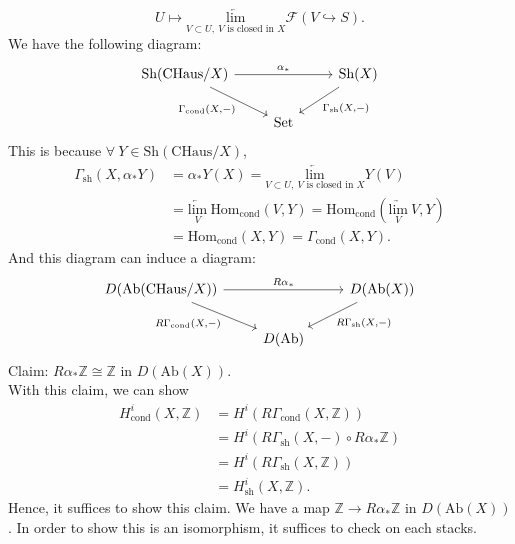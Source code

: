 \documentclass[UTF8,12,a4paper]{ctexart}
\theoremstyle{definition}
\begin{document}
\begin{itemize}
  	$$U\mapsto \underset{V\subset U,\ V \text{ is closed in } X}{\underleftarrow{\text{lim}} }\mathcal{F}(V\hookrightarrow S).$$ 
  	We have the following diagram:
  	\begin{equation*}
  	\begin{tikzcd}
  	\text{Sh}(\text{CHaus}/X) \arrow[rr, "\alpha_*"] \arrow[rd, "{\Gamma_{\text{cond}}(X,-)}"'] &            & \text{Sh}(X) \arrow[ld, "{\Gamma_{\text{sh}}(X,-)}"] \\
  	& \text{Set} &                                                     
  	\end{tikzcd}
  	\end{equation*}
  	This is because $\forall\  Y\in \text{Sh}(\text{CHaus}/X)$,
  	\begin{align*}
  	\Gamma_{\text{sh}}(X,\alpha_* Y)
  	&=\alpha_* Y(X)=\underset{V\subset U,\ V \text{ is closed in } X}{\underleftarrow{\text{lim}} } Y(V)\\
  	&=\underset{V}{\underleftarrow{\text{lim}}}\  \text{Hom}_\text{cond}(V,Y)=\text{Hom}_\text{cond}(\underset{V}{\underrightarrow{\text{lim}}} \ V,Y)\\
  	&=\text{Hom}_\text{cond}(X,Y)=\Gamma_{\text{cond}}(X,Y).
  	\end{align*}
  	And this diagram can induce a diagram:
  	\begin{equation*}
  	\begin{tikzcd}
  	D(\text{Ab}(\text{CHaus}/X)) \arrow[rr, "R\alpha_*"] \arrow[rd, "{R\Gamma_{\text{cond}}(X,-)}"'] &            & D(\text{Ab}(X)) \arrow[ld, "{R\Gamma_{\text{sh}}(X,-)}"] \\
  	& D(\text{Ab}) &                                                     
  	\end{tikzcd}
  	\end{equation*}
  	Claim: $R\alpha_*\mathbb{Z}\cong \mathbb{Z}$ in $D(\text{Ab}(X))$.\\
  	With this claim, we can show 
  	\begin{align*}
  	H^i_{\text{cond}}(X,\mathbb{Z})
  	&=H^i(R\Gamma_{\text{cond}}(X,\mathbb{Z}))\\
  	&=H^i(R\Gamma_{\text{sh}}(X,-)\circ R\alpha_* \mathbb{Z})\\
  	&=H^i(R\Gamma_{\text{sh}}(X,\mathbb{Z}))\\
  	&=H^i_\text{sh}(X,\mathbb{Z}).
  	\end{align*}
  	Hence, it suffices to show this claim. We have a map $\mathbb{Z}\to  R\alpha_*\mathbb{Z}$ in $D(\text{Ab}(X))$. In order to show this is an isomorphism, it suffices to check on each stacks.\\

\end{itemize}
\end{document}
